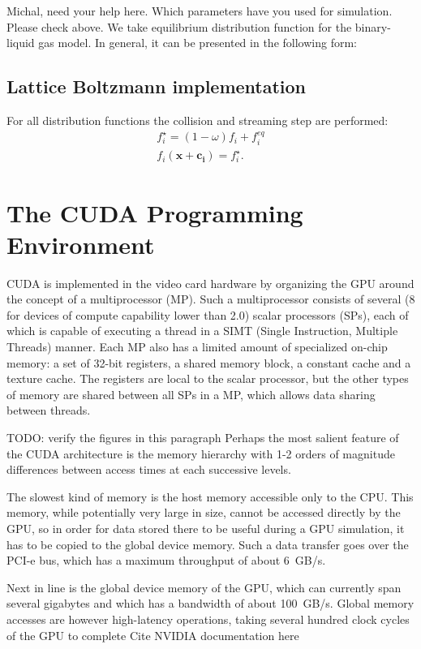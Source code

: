 \documentclass[mathpazo,sort,numbers]{cicp}
\begin{document}
{\color{red} Michal, need your help here. Which parameters have you used for simulation. Please check above.}
We take equilibrium distribution function for the binary-liquid gas model. In general, it can be presented in the following form:

\subsection{Lattice Boltzmann implementation}
For all distribution functions the collision and streaming step are performed:
\begin{equation*}
\begin{aligned}
f_i^{\star}=(1-\omega)f_i+f_i^{eq}\\
f_i(\bm{x}+\bm{c_i})=f_i^{\star}. 
\end{aligned}
\end{equation*}


\section{The CUDA Programming Environment}


CUDA is implemented in the video card hardware by organizing the GPU around the
concept of a multiprocessor (MP).  Such a multiprocessor consists of several (8 for
devices of compute capability lower than 2.0) scalar processors (SPs), each of which is
capable of executing a thread in a SIMT (Single Instruction, Multiple Threads) manner.
Each MP also has a limited amount of specialized on-chip memory: a set of 32-bit registers,
a shared memory block, a constant cache and a texture cache.  The registers are local
to the scalar processor, but the other types of memory are shared between all SPs
in a MP, which allows data sharing between threads.

{\color{red} TODO: verify the figures in this paragraph}
Perhaps the most salient feature of the CUDA architecture is the memory hierarchy
with 1-2 orders of magnitude differences between access times at each successive levels.

The slowest kind of memory is the host memory accessible only to the CPU.  This memory,
while potentially very large in size, cannot be accessed directly by the GPU, so in order
for data stored there to be useful during a GPU simulation, it has to be copied to the
global device memory.  Such a data transfer goes over the PCI-e bus, which has a maximum
throughput of about 6~GB/s.

Next in line is the global device memory of the GPU, which can currently span several
gigabytes and which has a bandwidth of about 100~GB/s.  Global memory accesses are however
high-latency operations, taking several hundred clock cycles of the GPU to complete {\color{red} Cite NVIDIA documentation here}
\end{document}
